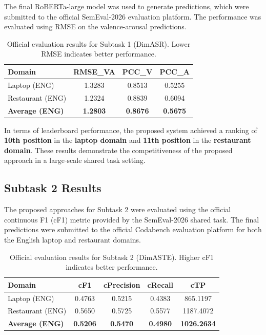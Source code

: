 \documentclass{article}
\begin{document}
The final RoBERTa-large model was used to generate predictions, which were submitted to the official SemEval-2026 evaluation platform. The performance was evaluated using RMSE on the valence-arousal predictions.

\begin{table}[htbp]
\centering
\caption{Official evaluation results for Subtask 1 (DimASR). Lower RMSE indicates better performance.}
\label{tab:official_results}
\begin{tabular}{lccc}
\hline
\textbf{Domain} & \textbf{RMSE\_VA} & \textbf{PCC\_V} & \textbf{PCC\_A} \\
\hline
Laptop (ENG) & 1.3283 & 0.8513 & 0.5255 \\
Restaurant (ENG) & 1.2324 & 0.8839 & 0.6094 \\
\hline
\textbf{Average (ENG)} & \textbf{1.2803} & \textbf{0.8676} & \textbf{0.5675} \\
\hline
\end{tabular}
\end{table}

In terms of leaderboard performance, the proposed system achieved a ranking of \textbf{10th position} in the \textbf{laptop domain} and \textbf{11th position} in the \textbf{restaurant domain}. These results demonstrate the competitiveness of the proposed approach in a large-scale shared task setting.

\subsection{Subtask 2 Results}

The proposed approaches for Subtask 2 were evaluated using the official continuous F1 (cF1) metric provided by the SemEval-2026 shared task. The final predictions were submitted to the official Codabench evaluation platform for both the English laptop and restaurant domains.

\begin{table}[htbp]
\centering
\caption{Official evaluation results for Subtask 2 (DimASTE). Higher cF1 indicates better performance.}
\label{tab:subtask2_results}
\begin{tabular}{lcccc}
\hline
\textbf{Domain} & \textbf{cF1} & \textbf{cPrecision} & \textbf{cRecall} & \textbf{cTP} \\
\hline
Laptop (ENG) & 0.4763 & 0.5215 & 0.4383 & 865.1197 \\
Restaurant (ENG) & 0.5650 & 0.5725 & 0.5577 & 1187.4072 \\
\hline
\textbf{Average (ENG)} & \textbf{0.5206} & \textbf{0.5470} & \textbf{0.4980} & \textbf{1026.2634} \\
\hline
\end{tabular}
\end{table}
\end{document}
